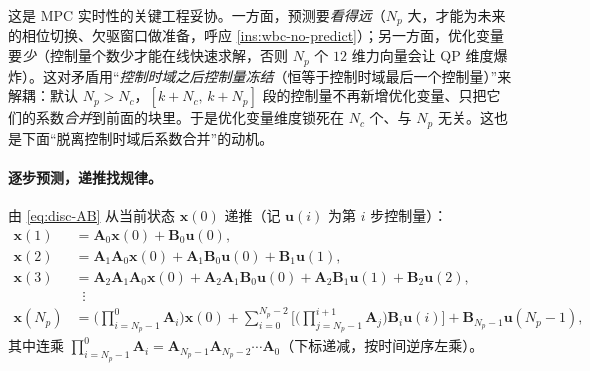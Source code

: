 \begin{insight}\label{ins:horizon-tradeoff}
这是 MPC 实时性的关键工程妥协。一方面，预测要\emph{看得远}（$N_p$ 大，才能为未来的相位切换、欠驱窗口做准备，呼应 \cref{ins:wbc-no-predict}）；另一方面，优化变量要\emph{少}（控制量个数少才能在线快速求解，否则 $N_p$ 个 $12$ 维力向量会让 QP 维度爆炸）。这对矛盾用“\emph{控制时域之后控制量冻结}（恒等于控制时域最后一个控制量）”来解耦：默认 $N_p>N_c$，$[k{+}N_c,\,k{+}N_p]$ 段的控制量不再新增优化变量、只把它们的系数\emph{合并}到前面的块里。于是优化变量维度锁死在 $N_c$ 个、与 $N_p$ 无关。这也是下面“脱离控制时域后系数合并”的动机。
\end{insight}

\paragraph{逐步预测，递推找规律。}
由 \cref{eq:disc-AB} 从当前状态 $\boldsymbol{x}(0)$ 递推（记 $\boldsymbol{u}(i)$ 为第 $i$ 步控制量）\cite{yu2021quadruped}：
\begin{equation}
\begin{aligned}
  \boldsymbol{x}(1) &= \mathbf{A}_0\boldsymbol{x}(0)+\mathbf{B}_0\boldsymbol{u}(0),\\
  \boldsymbol{x}(2) &= \mathbf{A}_1\mathbf{A}_0\boldsymbol{x}(0)+\mathbf{A}_1\mathbf{B}_0\boldsymbol{u}(0)+\mathbf{B}_1\boldsymbol{u}(1),\\
  \boldsymbol{x}(3) &= \mathbf{A}_2\mathbf{A}_1\mathbf{A}_0\boldsymbol{x}(0)+\mathbf{A}_2\mathbf{A}_1\mathbf{B}_0\boldsymbol{u}(0)+\mathbf{A}_2\mathbf{B}_1\boldsymbol{u}(1)+\mathbf{B}_2\boldsymbol{u}(2),\\
  &\;\;\vdots\\
  \boldsymbol{x}(N_p) &= \Big(\prod_{i=N_p-1}^{0}\mathbf{A}_i\Big)\boldsymbol{x}(0)+\sum_{i=0}^{N_p-2}\Big[\Big(\prod_{j=N_p-1}^{i+1}\mathbf{A}_j\Big)\mathbf{B}_i\boldsymbol{u}(i)\Big]+\mathbf{B}_{N_p-1}\boldsymbol{u}(N_p-1),
\end{aligned}
\label{eq:recursion}
\end{equation}
其中连乘 $\prod_{i=N_p-1}^{0}\mathbf{A}_i=\mathbf{A}_{N_p-1}\mathbf{A}_{N_p-2}\cdots\mathbf{A}_0$（下标递减，按时间逆序左乘）。

